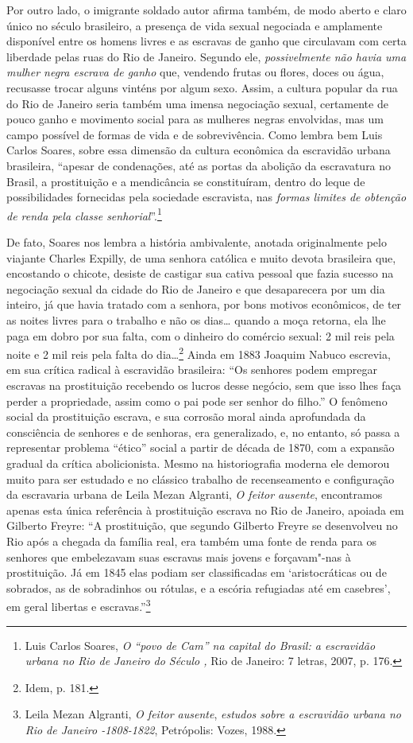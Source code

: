 Por outro lado, o imigrante soldado autor afirma também, de modo aberto
e claro único no século  brasileiro, a presença de vida sexual
negociada e amplamente disponível entre os homens livres e as escravas
de ganho que circulavam com certa liberdade pelas ruas do Rio de
Janeiro. Segundo ele, \emph{possivelmente não havia uma mulher negra
escrava de ganho} que, vendendo frutas ou flores, doces ou água,
recusasse trocar alguns vinténs por algum sexo. Assim, a cultura popular
da rua do Rio de Janeiro seria também uma imensa negociação sexual,
certamente de pouco ganho e movimento social para as mulheres negras
envolvidas, mas um campo possível de formas de vida e de sobrevivência.
Como lembra bem Luis Carlos Soares, sobre essa dimensão da cultura
econômica da escravidão urbana brasileira, ``apesar de condenações, até
as portas da abolição da escravatura no Brasil, a prostituição e a
mendicância se constituíram, dentro do leque de possibilidades
fornecidas pela sociedade escravista, nas \emph{formas limites de
obtenção de renda pela classe senhorial}''.\footnote{Luis Carlos Soares,
  \emph{O ``povo de Cam'' na capital do Brasil: a escravidão urbana no
  Rio de Janeiro do Século ,} Rio de Janeiro: 7 letras, 2007, p. 176.}

De fato, Soares nos lembra a história ambivalente, anotada originalmente
pelo viajante Charles Expilly, de uma senhora católica e muito devota
brasileira que, encostando o chicote, desiste de castigar sua cativa
pessoal que fazia sucesso na negociação sexual da cidade do Rio de
Janeiro e que desaparecera por um dia inteiro, já que havia tratado com
a senhora, por bons motivos econômicos, de ter as noites livres para o
trabalho e não os dias\ldots{} quando a moça retorna, ela lhe paga em dobro
por sua falta, com o dinheiro do comércio sexual: 2 mil reis pela noite
e 2 mil reis pela falta do dia\ldots{}\footnote{Idem, p. 181.} Ainda em 1883
Joaquim Nabuco escrevia, em sua crítica radical à escravidão brasileira:
``Os senhores podem empregar escravas na prostituição recebendo os
lucros desse negócio, sem que isso lhes faça perder a propriedade, assim
como o pai pode ser senhor do filho.'' O fenômeno social da prostituição
escrava, e sua corrosão moral ainda aprofundada da consciência de
senhores e de senhoras, era generalizado, e, no entanto, só passa a
representar problema ``ético'' social a partir de década de 1870, com a
expansão gradual da crítica abolicionista. Mesmo na historiografia
moderna ele demorou muito para ser estudado e no clássico trabalho de
recenseamento e configuração da escravaria urbana de Leila Mezan
Algranti, \emph{O feitor ausente}, encontramos apenas esta única
referência à prostituição escrava no Rio de Janeiro, apoiada em Gilberto
Freyre: ``A prostituição, que segundo Gilberto Freyre se desenvolveu no
Rio após a chegada da família real, era também uma fonte de renda para
os senhores que embelezavam suas escravas mais jovens e forçavam"-nas à
prostituição. Já em 1845 elas podiam ser classificadas em
`aristocráticas ou de sobrados, as de sobradinhos ou rótulas, e a
escória refugiadas até em casebres', em geral libertas e
escravas.''\footnote{Leila Mezan Algranti, \emph{O feitor ausente},
  \emph{estudos sobre a escravidão urbana no Rio de Janeiro -1808-1822},
  Petrópolis: Vozes, 1988.}

